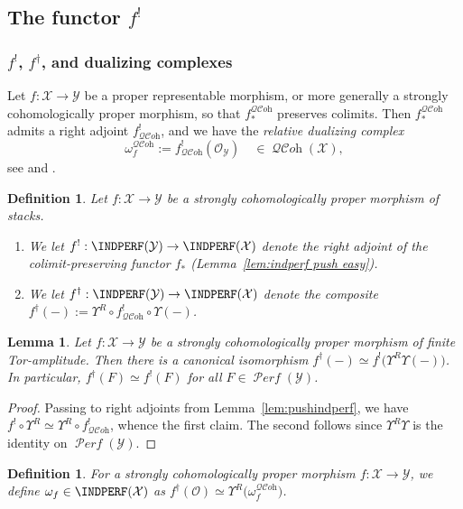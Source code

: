 \documentclass[12pt, oneside]{amsart}
\numberwithin{equation}{section}
\newtheorem{definition}[subsubsection]{Definition}
\newtheorem{lemma}[subsubsection]{Lemma}
\theoremstyle{remark}
\theoremstyle{plain}
\DeclareMathOperator{\QCOH}{\mathcal{QC}\textit{oh}}
\DeclareMathOperator{\PERF}{\mathcal{P}\textit{erf}}
\newcommand{\OO}{\mathcal{O}}
\newcommand{\YY}{\mathcal{Y}}
\newcommand{\XX}{\mathcal{X}}
\newcommand{\Ren}{\Upsilon}
\begin{document}
\subsection{The functor \texorpdfstring{$f^!$}{f\textasciicircum !}}\label{ssec:indperf dualizing complex}

\subsubsection{$f^!$, $f^\dag$, and dualizing complexes}

Let $f : \XX \to \YY$ be a proper representable morphism, or more generally a strongly cohomologically proper morphism, so that $f_*^{\QCOH}$ preserves colimits.
Then $f_*^{\QCOH}$ admits a right adjoint $f^!_{\QCOH}$, and we have the \emph{relative dualizing complex}
\[
  \omega_f^{\QCOH} := f^!_{\QCOH}(\OO_\YY) \quad \in \QCOH(\XX),
\]
see \cite[Cor.~6.3.4.3, \S 6.4.2]{SAG} and \cite[Prop.~A.1.5]{HLP}.

\begin{definition}
Let $f : \XX \to \YY$ be a strongly cohomologically proper morphism of stacks.
\begin{enumerate}
\item We let $f^! : \INDPERF(\YY) \to \INDPERF(\XX)$ denote the right adjoint of the colimit-preserving functor $f_*$ (Lemma~\ref{lem:indperf push easy}).

\item We let $f^\dag : \INDPERF(\YY) \to \INDPERF(\XX)$ denote the composite $f^\dag(-) := \Ren^R \circ f^!_{\QCOH} \circ \Ren (-)$.
\end{enumerate}
\end{definition}

\begin{lemma}\label{lem:f^dag vs f^!}
Let $f : \XX \to \YY$ be a strongly cohomologically proper morphism of finite Tor-amplitude.
Then there is a canonical isomorphism $f^\dag(-) \simeq f^! \bigl( \Ren^R \Ren(-) \bigr)$.
In particular, $f^\dag(F) \simeq f^!(F)$ for all $F \in \PERF(\YY)$.
\end{lemma}
\begin{proof}
Passing to right adjoints from Lemma~\ref{lem:pushindperf}, we have $f^! \circ \Ren^R \simeq \Ren^R \circ f^!_{\QCOH}$, whence the first claim.
The second follows since $\Ren^R \Ren$ is the identity on $\PERF(\YY)$.
\end{proof}

\begin{definition}
For a strongly cohomologically proper morphism $f : \XX \to \YY$, we define $\omega_f \in \INDPERF(\XX)$ as $f^\dag(\OO) \simeq \Ren^R \bigl( \omega_f^{\QCOH} \bigr)$.
\end{definition}
\end{document}
